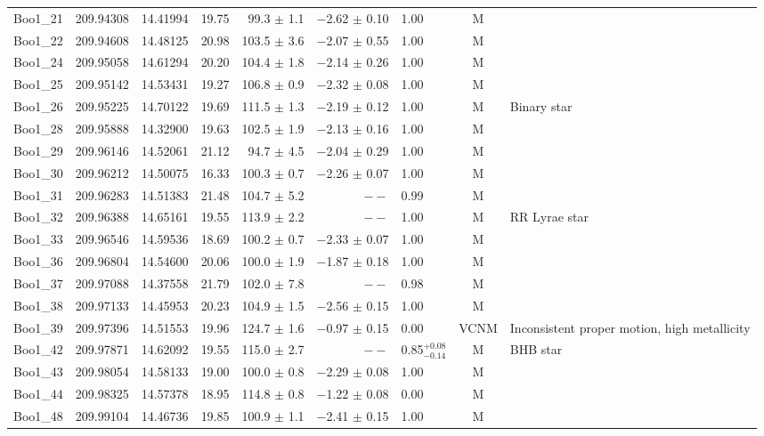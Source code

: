 \begin{table*}[t]
\begin{tabular}{lllrrrlcl}
Boo1\_21 & 209.94308 & 14.41994 & 19.75 & 99.3  $\pm$ 1.1 & $-$2.62  $\pm$ 0.10 & 1.00 & M & \\ 
Boo1\_22 & 209.94608 & 14.48125 & 20.98 & 103.5  $\pm$ 3.6 & $-$2.07  $\pm$ 0.55 & 1.00 & M & \\ 
Boo1\_24 & 209.95058 & 14.61294 & 20.20 & 104.4  $\pm$ 1.8 & $-$2.14  $\pm$ 0.26 & 1.00 & M & \\ 
Boo1\_25 & 209.95142 & 14.53431 & 19.27 & 106.8  $\pm$ 0.9 & $-$2.32  $\pm$ 0.08 & 1.00 & M & \\ 
Boo1\_26 & 209.95225 & 14.70122 & 19.69 & 111.5  $\pm$ 1.3 & $-$2.19  $\pm$ 0.12 & 1.00 & M & Binary star\\ 
Boo1\_28 & 209.95888 & 14.32900 & 19.63 & 102.5  $\pm$ 1.9 & $-$2.13  $\pm$ 0.16 & 1.00 & M & \\ 
Boo1\_29 & 209.96146 & 14.52061 & 21.12 & 94.7  $\pm$ 4.5 & $-$2.04  $\pm$ 0.29 & 1.00 & M & \\ 
Boo1\_30 & 209.96212 & 14.50075 & 16.33 & 100.3  $\pm$ 0.7 & $-$2.26  $\pm$ 0.07 & 1.00 & M & \\ 
Boo1\_31 & 209.96283 & 14.51383 & 21.48 & 104.7  $\pm$ 5.2 & $--$  & 0.99 & M & \\ 
Boo1\_32 & 209.96388 & 14.65161 & 19.55 & 113.9  $\pm$ 2.2 & $--$  & 1.00 & M & RR Lyrae star\\ 
Boo1\_33 & 209.96546 & 14.59536 & 18.69 & 100.2  $\pm$ 0.7 & $-$2.33  $\pm$ 0.07 & 1.00 & M & \\ 
Boo1\_36 & 209.96804 & 14.54600 & 20.06 & 100.0  $\pm$ 1.9 & $-$1.87  $\pm$ 0.18 & 1.00 & M & \\ 
Boo1\_37 & 209.97088 & 14.37558 & 21.79 & 102.0  $\pm$ 7.8 & $--$  & 0.98 & M & \\ 
Boo1\_38 & 209.97133 & 14.45953 & 20.23 & 104.9  $\pm$ 1.5 & $-$2.56  $\pm$ 0.15 & 1.00 & M & \\ 
Boo1\_39 & 209.97396 & 14.51553 & 19.96 & 124.7  $\pm$ 1.6 & $-$0.97  $\pm$ 0.15 & 0.00 & VCNM & Inconsistent proper motion, high metallicity\\ 
Boo1\_42 & 209.97871 & 14.62092 & 19.55 & 115.0  $\pm$ 2.7 & $--$  & 0.85$^{+0.08}_{-0.14}$ & M & BHB star\\ 
Boo1\_43 & 209.98054 & 14.58133 & 19.00 & 100.0  $\pm$ 0.8 & $-$2.29  $\pm$ 0.08 & 1.00 & M & \\ 
Boo1\_44 & 209.98325 & 14.57378 & 18.95 & 114.8  $\pm$ 0.8 & $-$1.22  $\pm$ 0.08 & 0.00 & M & \\ 
Boo1\_48 & 209.99104 & 14.46736 & 19.85 & 100.9  $\pm$ 1.1 & $-$2.41  $\pm$ 0.15 & 1.00 & M & \\ 

\end{tabular}
\end{table*}
